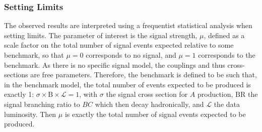 \subsubsection{Setting Limits}
\label{sec:CWoLa:limits}
The observed results are interpreted using a frequentist statistical analysis when setting limits.
The parameter of interest is the signal strength, $\mu$, defined as a scale factor on the total number of signal events expected relative to some benchmark, so that $\mu=0$ corresponds to no signal, and $\mu=1$ corresponds to the benchmark.
As there is no specific signal model, the couplings and thus cross-sections are free parameters.
Therefore, the benchmark is defined to be such that, in the benchmark model, the total number of events expected to be produced is exactly 1: $\sigma\times\text{B}\times\mathcal{L}=1$, with $\sigma$ the signal cross section for $A$ production, $\text{BR}$ the signal branching ratio to $BC$ which then decay hadronically, and $\mathcal{L}$ the data luminosity.
Then $\mu$ is exactly the total number of signal events expected to be produced.


